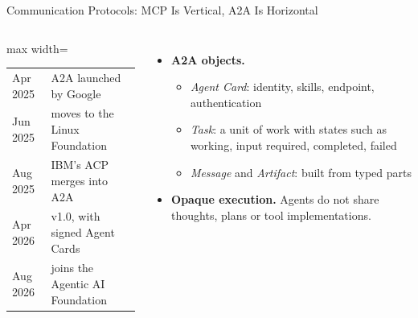 \begin{frame}{Communication Protocols: MCP Is Vertical, A2A Is Horizontal}
\begin{columns}[T,onlytextwidth]
        \vspace{0.3em}
        \scriptsize
        \begin{adjustbox}{max width=\linewidth}\begin{tabular}{ll}
            \toprule
            Apr 2025 & A2A launched by Google \\
            Jun 2025 & moves to the Linux Foundation \\
            Aug 2025 & IBM's ACP merges into A2A \\
            Apr 2026 & v1.0, with signed Agent Cards \\
            Aug 2026 & joins the Agentic AI Foundation \\
            \bottomrule
        \end{tabular}\end{adjustbox}
        \begin{itemize}\itemsep0.45em
            \item \textbf{A2A objects.}
            \begin{itemize}\itemsep0.15em
                \item \emph{Agent Card}: identity, skills, endpoint, authentication
                \item \emph{Task}: a unit of work with states such as working, input required, completed, failed
                \item \emph{Message} and \emph{Artifact}: built from typed parts
            \end{itemize}
            \item \textbf{Opaque execution.} Agents do not share thoughts, plans or tool implementations.
        \end{itemize}
    \end{columns}
    \vspace{0.2em}
\end{frame}

